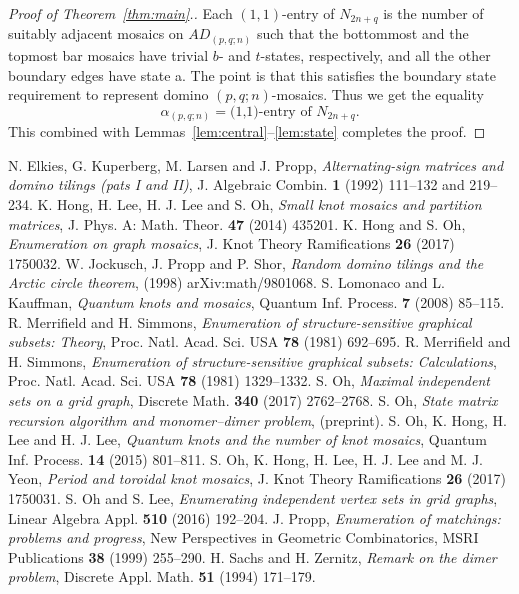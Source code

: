 \documentclass[11pt,a4paper]{amsart}
\begin{document}
\begin{proof}[Proof of Theorem~\ref{thm:main}.]
Each $(1,1)$-entry of $N_{2n+q}$ is the number of suitably adjacent mosaics on $AD_{(p,q;n)}$
such that the bottommost and the topmost bar mosaics have trivial $b$- and $t$-states, respectively,
and all the other boundary edges have state a.
The point is that this satisfies the boundary state requirement to represent domino $(p,q;n)$-mosaics.
Thus we get the equality
$$\alpha_{(p,q;n)} = \mbox{(1,1)-entry of } N_{2n+q}.$$
This combined with Lemmas~\ref{lem:central}--\ref{lem:state}
completes the proof.
\end{proof}




\begin{thebibliography}{11}

 N. Elkies, G. Kuperberg, M. Larsen and J. Propp,
    {\em Alternating-sign matrices and domino tilings (pats I and II)},
    J. Algebraic Combin. \textbf{1} (1992) 111--132 and 219--234.
 K. Hong, H. Lee, H. J. Lee and S. Oh,
    {\em Small knot mosaics and partition matrices},
    J. Phys. A: Math. Theor. \textbf{47} (2014) 435201.
 K. Hong and S. Oh,
    {\em Enumeration on graph mosaics},
    J. Knot Theory Ramifications \textbf{26} (2017) 1750032.
 W. Jockusch, J. Propp and P. Shor,
    {\em Random domino tilings and the Arctic circle theorem},
    (1998) arXiv:math/9801068.
 S. Lomonaco and L. Kauffman,
    {\em Quantum knots and mosaics},
    Quantum Inf. Process. \textbf{7} (2008) 85--115.
 R. Merrifield and H. Simmons,
    {\em Enumeration of structure-sensitive graphical subsets: Theory},
    Proc. Natl. Acad. Sci. USA \textbf{78} (1981) 692--695.
 R. Merrifield and H. Simmons,
    {\em Enumeration of structure-sensitive graphical subsets: Calculations},
    Proc. Natl. Acad. Sci. USA \textbf{78} (1981) 1329--1332.
 S. Oh,
    {\em Maximal independent sets on a grid graph},
    Discrete Math. \textbf{340} (2017) 2762--2768.
 S. Oh,
    {\em State matrix recursion algorithm and monomer--dimer problem},
    (preprint).
 S. Oh, K. Hong, H. Lee and H. J. Lee,
    {\em Quantum knots and the number of knot mosaics},
    Quantum Inf. Process. \textbf{14} (2015) 801--811.
 S. Oh, K. Hong, H. Lee, H. J. Lee and M. J. Yeon,
    {\em Period and toroidal knot mosaics},
    J. Knot Theory Ramifications \textbf{26} (2017) 1750031.
 S. Oh and S. Lee,
    {\em Enumerating independent vertex sets in grid graphs},
    Linear Algebra Appl. \textbf{510} (2016) 192--204.
 J. Propp,
    {\em Enumeration of matchings: problems and progress},
    New Perspectives in Geometric Combinatorics, MSRI Publications \textbf{38} (1999) 255--290.
 H. Sachs and H. Zernitz,
    {\em Remark on the dimer problem},
    Discrete Appl. Math. \textbf{51} (1994) 171--179.

\end{thebibliography}
\end{document}
